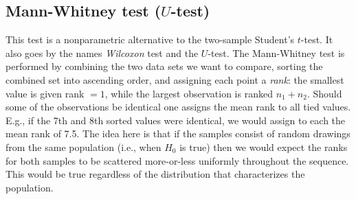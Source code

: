 \subsection{Mann-Whitney test ($U$-test)}

	This test is a nonparametric alternative to the two-sample Student's $t$-test.  It also goes by the 
names \emph{Wilcoxon} test and the $U$-test.  The Mann-Whitney test is performed by combining the two 
data sets we want to compare, sorting the combined set into ascending order, and assigning each point a \emph{rank}: 
the smallest value is given rank $= 1$, while the largest observation is ranked $n_1 + n_2$.  Should some of the 
observations be identical one assigns the mean rank to all tied values.  E.g., if the 7th and 8th 
sorted values were identical, we would assign to each the mean rank of 7.5.  The idea here is that if the samples 
consist of random drawings from the same population (i.e., when $H_0$ is true) then we would expect the ranks for both 
samples to be scattered more-or-less uniformly throughout the sequence.  This would be true regardless of the
distribution that characterizes the population.

